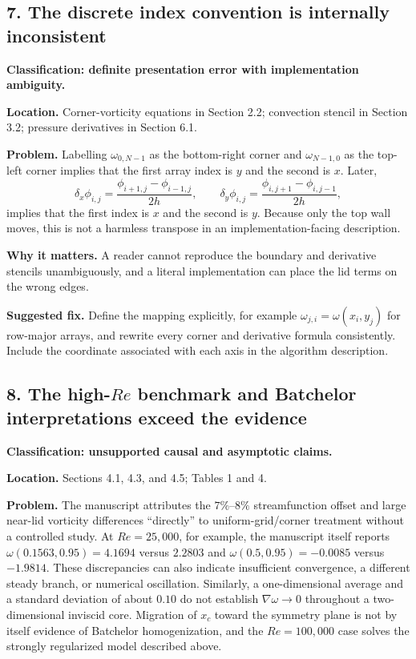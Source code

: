 \documentclass[11pt]{article}
\begin{document}
\subsection*{7. The discrete index convention is internally inconsistent}

\textbf{Classification: definite presentation error with implementation ambiguity.}

\textbf{Location.} Corner-vorticity equations in Section 2.2; convection stencil in Section 3.2; pressure derivatives in Section 6.1.

\textbf{Problem.} Labelling $\omega_{0,N-1}$ as the bottom-right corner and $\omega_{N-1,0}$ as the top-left corner implies that the first array index is $y$ and the second is $x$.  Later,
\[
\delta_x\phi_{i,j}=\frac{\phi_{i+1,j}-\phi_{i-1,j}}{2h},
\qquad
\delta_y\phi_{i,j}=\frac{\phi_{i,j+1}-\phi_{i,j-1}}{2h},
\]
implies that the first index is $x$ and the second is $y$.  Because only the top wall moves, this is not a harmless transpose in an implementation-facing description.

\textbf{Why it matters.} A reader cannot reproduce the boundary and derivative stencils unambiguously, and a literal implementation can place the lid terms on the wrong edges.

\textbf{Suggested fix.} Define the mapping explicitly, for example
$\omega_{j,i}=\omega(x_i,y_j)$ for row-major arrays, and rewrite every corner and derivative formula consistently.  Include the coordinate associated with each axis in the algorithm description.

\subsection*{8. The high-$Re$ benchmark and Batchelor interpretations exceed the evidence}

\textbf{Classification: unsupported causal and asymptotic claims.}

\textbf{Location.} Sections 4.1, 4.3, and 4.5; Tables 1 and 4.

\textbf{Problem.} The manuscript attributes the $7\%$--$8\%$ streamfunction offset and large near-lid vorticity differences ``directly'' to uniform-grid/corner treatment without a controlled study.  At $Re=25{,}000$, for example, the manuscript itself reports $\omega(0.1563,0.95)=4.1694$ versus $2.2803$ and $\omega(0.5,0.95)=-0.0085$ versus $-1.9814$.  These discrepancies can also indicate insufficient convergence, a different steady branch, or numerical oscillation.  Similarly, a one-dimensional average and a standard deviation of about $0.10$ do not establish $\nabla\omega\to0$ throughout a two-dimensional inviscid core.  Migration of $x_c$ toward the symmetry plane is not by itself evidence of Batchelor homogenization, and the $Re=100{,}000$ case solves the strongly regularized model described above.
\end{document}
